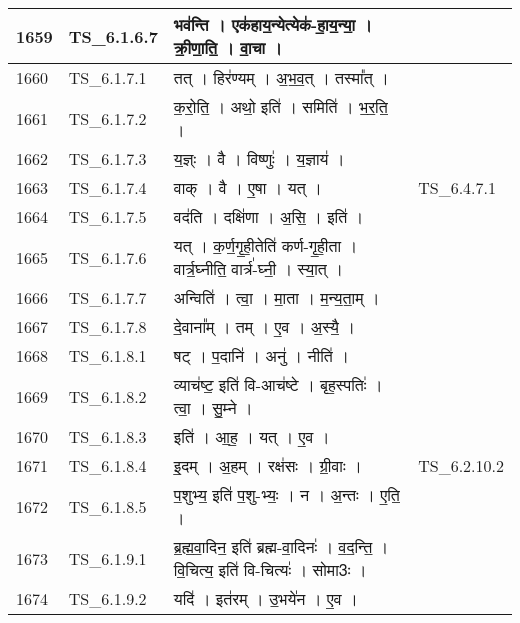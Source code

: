 \documentclass[17pt]{extarticle}
\begin{document}
\begin{longtable}{||p{0.4in}||p{0.9in}||p{4.0in}||p{0.9in}||}
        \hline
            1659 & TS\_6.1.6.7 & भव॑न्ति   ।   एक॑हाय॒न्येत्येक॑{-}हा॒य॒न्या॒   ।   क्री॒णा॒ति॒   ।   वा॒चा   ।    &      \\
        \hline
            1660 & TS\_6.1.7.1 & तत्   ।   हिर॑ण्यम्   ।   अ॒भ॒व॒त्   ।   तस्मा᳚त्   ।    &      \\
        \hline
            1661 & TS\_6.1.7.2 & क॒रो॒ति॒   ।   अथो॒ इति॑   ।   समिति॑   ।   भ॒र॒ति॒   ।    &      \\
        \hline
            1662 & TS\_6.1.7.3 & य॒ज्ञ्ः   ।   वै   ।   विष्णुः॑   ।   य॒ज्ञाय॑   ।    &      \\
        \hline
            1663 & TS\_6.1.7.4 & वाक्   ।   वै   ।   ए॒षा   ।   यत्   ।    &  TS\_6.4.7.1       \\
        \hline
            1664 & TS\_6.1.7.5 & वद॑ति   ।   दक्षि॑णा   ।   अ॒सि॒   ।   इति॑   ।    &      \\
        \hline
            1665 & TS\_6.1.7.6 & यत्   ।   क॒र्ण॒गृ॒ही॒तेति॑ कर्ण{-}गृ॒ही॒ता   ।   वार्त्र॒घ्नीति॒ वार्त्र॑{-}घ्नी॒   ।   स्या॒त्   ।    &      \\
        \hline
            1666 & TS\_6.1.7.7 & अन्विति॑   ।   त्वा॒   ।   मा॒ता   ।   म॒न्य॒ता॒म्   ।    &      \\
        \hline
            1667 & TS\_6.1.7.8 & दे॒वाना᳚म्   ।   तम्   ।   ए॒व   ।   अ॒स्यै॒   ।    &      \\
        \hline
            1668 & TS\_6.1.8.1 & षट्   ।   प॒दानि॑   ।   अनु॑   ।   नीति॑   ।    &      \\
        \hline
            1669 & TS\_6.1.8.2 & व्याच॑ष्ट॒ इति॑ वि{-}आच॑ष्टे   ।   बृह॒स्पतिः॑   ।   त्वा॒   ।   सु॒म्ने   ।    &      \\
        \hline
            1670 & TS\_6.1.8.3 & इति॑   ।   आ॒ह॒   ।   यत्   ।   ए॒व   ।    &      \\
        \hline
            1671 & TS\_6.1.8.4 & इ॒दम्   ।   अ॒हम्   ।   रक्ष॑सः   ।   ग्री॒वाः   ।    &  TS\_6.2.10.2       \\
        \hline
            1672 & TS\_6.1.8.5 & प॒शुभ्य॒ इति॑ प॒शु{-}भ्यः॒   ।   न   ।   अ॒न्तः   ।   ए॒ति॒   ।    &      \\
        \hline
            1673 & TS\_6.1.9.1 & ब्र॒ह्म॒वा॒दिन॒ इति॑ ब्रह्म{-}वा॒दिनः॑   ।   व॒द॒न्ति॒   ।   वि॒चित्य॒ इति॑ वि{-}चित्यः॑   ।   सोमा3ः   ।    &      \\
        \hline
            1674 & TS\_6.1.9.2 & यदि॑   ।   इत॑रम्   ।   उ॒भये॑न   ।   ए॒व   ।    &      \\

\end{longtable}
\end{document}

